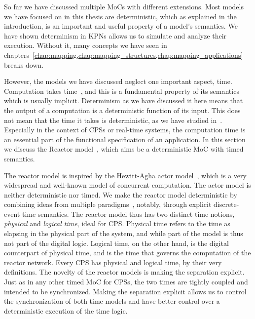 So far we have discussed multiple \acp{MoC} with different extensions.
Most models we have focused on in this thesis are deterministic, which as explained in the introduction, is an important and useful property of a model's semantics.
We have shown determinism in \acp{KPN} allows us to simulate and analyze their execution.
Without it, many concepts we have seen in chapters~\ref{chap:mapping,chap:mapping_structures,chap:mapping_applications} breaks down.

However, the models we have discussed neglect one important aspect, time.
Computation takes time~\cite{lee2009computing}, and this is a fundamental property of its semantics which is usually implicit.
Determinism as we have discussed it here means that the output of a computation is a deterministic function of its input.
This does not mean that the time it takes is deterministic, as we have studied in~\cite{goens_scopes17}.
Especially in the context of \acp{CPS} or real-time systems, the computation time is an essential part of the functional specification of an application.
In this section we discuss the Reactor model~\cite{lohstroh_dac19}, which aims be a deterministic \ac{MoC} with timed semantics.

The reactor model is inspired by the Hewitt-Agha actor model~\cite{Agha:86:Actors}, which is a very widespread and well-known model of concurrent computation.
The actor model is neither deterministic nor timed.
We make the reactor model deterministic by combining ideas from multiple paradigms~\cite{lohstroh_fdl19}, notably, through explicit discrete-event time semantics.
The reactor model thus has two distinct time notions, \emph{physical} and \emph{logical time}, ideal for \ac{CPS}.
Physical time refers to the time as elapsing in the physical part of the system, and while part of the model is thus not part of the digital logic.
Logical time, on the other hand, is the digital counterpart of physical time, and is the time that governs the computation of the reactor network.
Every \ac{CPS} has physical and logical time, by their very definitions. The novelty of the reactor models is making the separation explicit.
Just as in any other timed \ac{MoC} for \acp{CPS}, the two times are tightly coupled and intended to be synchronized. 
Making the separation explicit allows us to control the synchronization of both time models and have better control over a deterministic execution of the time logic.

